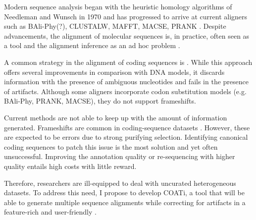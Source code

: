 Modern sequence analysis began with the heuristic homology algorithms of
Needleman and Wunsch in 1970 \parencite{identification_smith_1981} and has
progressed to arrive at current aligners such as BAli-Phy(?), CLUSTALW, MAFFT,
MACSE, PRANK .
Despite  advancements, the alignment of molecular sequences
is, in practice, often seen as a tool and the alignment inference as an ad hoc
problem \parencite{morrison_MSA_2018}.

A common strategy in the alignment of coding sequences is .
While this approach offers several improvements in comparison with DNA models,
it discards information with the presence of ambiguous nucleotides and fails
in the presence of artifacts.
Although some aligners incorporate codon substitution models (e.g. BAli-Phy,
PRANK, MACSE), they do not support frameshifts.

Current methods are not able to keep up with the amount of information
generated.
Frameshifts are common in coding-sequence datasets .
However, these are expected to be errors due to strong purifying selection.
Identifying canonical coding sequences to patch this issue is the most
 solution and yet often unsuccessful.
Improving the annotation quality or re-sequencing with higher quality entails
high costs with little reward.

Therefore, researchers are ill-equipped to deal with uncurated heterogeneous
datasets. To address this need, I propose to develop COATi, a tool that will
be able to generate multiple sequence alignments while correcting for artifacts
in a feature-rich and user-friendly .
